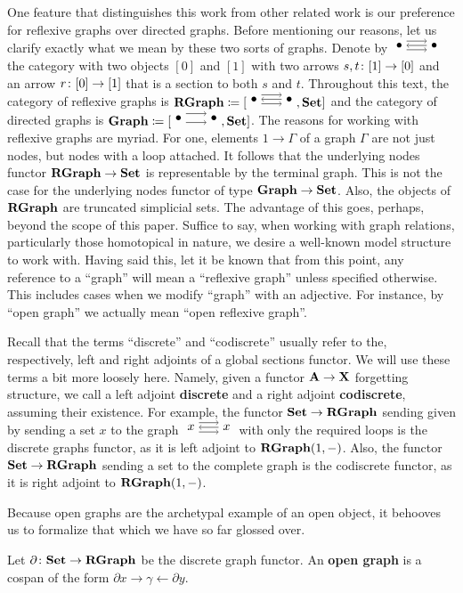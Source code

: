 One feature that distinguishes this work from other related work is our preference for reflexive graphs over directed graphs.  Before mentioning our reasons, let us clarify exactly what we mean by these two sorts of graphs. Denote by $ \rgraph{\bullet}{\bullet} $ the category with two objects $ [0] $ and $ [1] $ with two arrows $ s,t \colon [1] \to [0] $ and an arrow $ r \colon [0] \to [1] $ that is a section to both $ s $ and $ t $.  Throughout this text, the category of reflexive graphs is $ \RGraph \coloneqq [ \rgraph{\bullet}{\bullet} , \Set] $ and the category of directed graphs is $ \Graph \coloneqq [ \graph{\bullet}{\bullet} , \Set ] $.  The reasons for working with reflexive graphs are myriad.  For one, elements $ 1 \to \Gamma $ of a graph $ \Gamma $ are not just nodes, but nodes with a loop attached.  It follows that the underlying nodes functor $ \mathbf{RGraph} \to \mathbf{Set} $ is representable by the terminal graph. This is not the case for the underlying nodes functor of type $ \mathbf{Graph} \to \mathbf{Set} $.  Also, the objects of $ \mathbf{RGraph} $ are truncated simplicial sets. The advantage of this goes, perhaps, beyond the scope of this paper. Suffice to say, when working with graph relations, particularly those homotopical in nature, we desire a well-known model structure to work with.  Having said this, let it be known that from this point, any reference to a ``graph'' will mean a ``reflexive graph'' unless specified otherwise. This includes cases when we modify ``graph'' with an adjective. For instance, by ``open graph'' we actually mean ``open reflexive graph''.

Recall that the terms ``discrete'' and ``codiscrete'' usually refer to the, respectively, left and right adjoints of a global sections functor. We will use these terms a bit more loosely here.  Namely, given a functor $ \mathbf{A} \to \mathbf{X} $ forgetting structure,
we call a left adjoint \textbf{discrete} and a right adjoint \textbf{codiscrete}, assuming their existence.  For example, the functor $ \mathbf{Set} \to \mathbf{RGraph} $ sending given by sending a set $ x $ to the graph $ \rgraph{x}{x} $ with only the required loops is the discrete graphs functor, as it is left adjoint to $ \mathbf{RGraph} (1,-) $.  Also, the functor $ \mathbf{Set} \to \mathbf{RGraph} $ sending a set to the complete graph is the codiscrete functor, as it is right adjoint to $ \mathbf{RGraph} (1,-) $.

Because open graphs are the archetypal example of an open object, it behooves us to formalize that which we have so far glossed over. 

\begin{df} \label{df:OpenGraph}
	Let $ \partial \colon \mathbf{Set} \to \mathbf{RGraph} $ be the discrete graph functor.  An \textbf{open graph} is a cospan of the form $ \partial x \to \gamma \gets \partial y $.  
\end{df}

